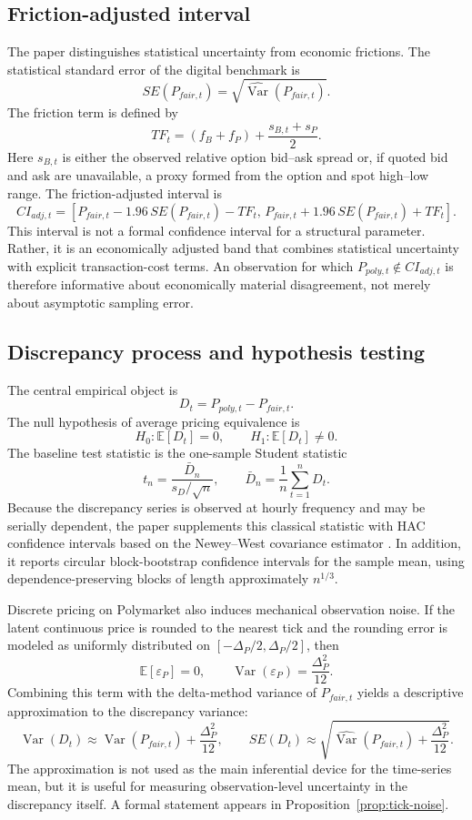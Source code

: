 \documentclass[11pt]{article}
\numberwithin{equation}{section}
\theoremstyle{plain}
\begin{document}
\subsection{Friction-adjusted interval}
The paper distinguishes statistical uncertainty from economic frictions. The statistical standard error of the digital benchmark is
\[
SE(P_{fair,t})=\sqrt{\widehat{\operatorname{Var}}(P_{fair,t})}.
\]
The friction term is defined by
\[
TF_t=(f_B+f_P)+\frac{s_{B,t}+s_P}{2}.
\]
Here $s_{B,t}$ is either the observed relative option bid--ask spread or, if quoted bid and ask are unavailable, a proxy formed from the option and spot high--low range. The friction-adjusted interval is
\[
CI_{adj,t}
=
\left[
P_{fair,t}-1.96\,SE(P_{fair,t})-TF_t,\,
P_{fair,t}+1.96\,SE(P_{fair,t})+TF_t
\right].
\]
This interval is not a formal confidence interval for a structural parameter. Rather, it is an economically adjusted band that combines statistical uncertainty with explicit transaction-cost terms. An observation for which $P_{poly,t}\notin CI_{adj,t}$ is therefore informative about economically material disagreement, not merely about asymptotic sampling error.

\subsection{Discrepancy process and hypothesis testing}
The central empirical object is
\[
D_t=P_{poly,t}-P_{fair,t}.
\]
The null hypothesis of average pricing equivalence is
\[
H_0:\mathbb{E}[D_t]=0,
\qquad
H_1:\mathbb{E}[D_t]\neq 0.
\]
The baseline test statistic is the one-sample Student statistic
\[
t_n=\frac{\bar{D}_n}{s_D/\sqrt{n}},
\qquad
\bar{D}_n=\frac{1}{n}\sum_{t=1}^n D_t.
\]
Because the discrepancy series is observed at hourly frequency and may be serially dependent, the paper supplements this classical statistic with HAC confidence intervals based on the Newey--West covariance estimator \citep{newey1987}. In addition, it reports circular block-bootstrap confidence intervals for the sample mean, using dependence-preserving blocks of length approximately $n^{1/3}$.

Discrete pricing on Polymarket also induces mechanical observation noise. If the latent continuous price is rounded to the nearest tick and the rounding error is modeled as uniformly distributed on $[-\Delta_P/2,\Delta_P/2]$, then
\[
\mathbb{E}[\varepsilon_P]=0,
\qquad
\operatorname{Var}(\varepsilon_P)=\frac{\Delta_P^2}{12}.
\]
Combining this term with the delta-method variance of $P_{fair,t}$ yields a descriptive approximation to the discrepancy variance:
\[
\operatorname{Var}(D_t)
\approx
\operatorname{Var}(P_{fair,t})+\frac{\Delta_P^2}{12},
\qquad
SE(D_t)
\approx
\sqrt{\widehat{\operatorname{Var}}(P_{fair,t})+\frac{\Delta_P^2}{12}}.
\]
The approximation is not used as the main inferential device for the time-series mean, but it is useful for measuring observation-level uncertainty in the discrepancy itself. A formal statement appears in Proposition~\ref{prop:tick-noise}.
\end{document}
